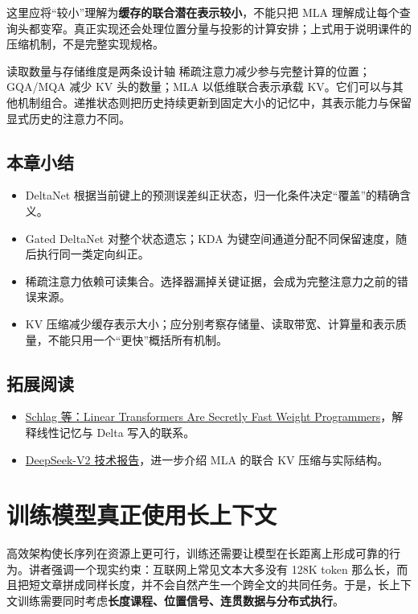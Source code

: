 \documentclass[11pt,a4paper]{article}
\begin{document}
这里应将“较小”理解为\textbf{缓存的联合潜在表示较小}，不能只把 MLA 理解成让每个查询头都变窄。真正实现还会处理位置分量与投影的计算安排；上式用于说明课件的压缩机制，不是完整实现规格。

\begin{importantbox}{读取数量与存储维度是两条设计轴}
稀疏注意力减少参与完整计算的位置；GQA/MQA 减少 KV 头的数量；MLA 以低维联合表示承载 KV。它们可以与其他机制组合。递推状态则把历史持续更新到固定大小的记忆中，其表示能力与保留显式历史的注意力不同。
\end{importantbox}

\subsection{本章小结}
\begin{itemize}
  \item DeltaNet 根据当前键上的预测误差纠正状态，归一化条件决定“覆盖”的精确含义。
  \item Gated DeltaNet 对整个状态遗忘；KDA 为键空间通道分配不同保留速度，随后执行同一类定向纠正。
  \item 稀疏注意力依赖可读集合。选择器漏掉关键证据，会成为完整注意力之前的错误来源。
  \item KV 压缩减少缓存表示大小；应分别考察存储量、读取带宽、计算量和表示质量，不能只用一个“更快”概括所有机制。
\end{itemize}

\subsection{拓展阅读}
\begin{itemize}
  \item \href{https://proceedings.mlr.press/v139/schlag21a.html}{Schlag 等：Linear Transformers Are Secretly Fast Weight Programmers}，解释线性记忆与 Delta 写入的联系。
  \item \href{https://arxiv.org/abs/2405.04434}{DeepSeek-V2 技术报告}，进一步介绍 MLA 的联合 KV 压缩与实际结构。
\end{itemize}

\clearpage
\section{训练模型真正使用长上下文}

高效架构使长序列在资源上更可行，训练还需要让模型在长距离上形成可靠的行为。讲者强调一个现实约束：互联网上常见文本大多没有 128K token 那么长，而且把短文章拼成同样长度，并不会自然产生一个跨全文的共同任务。于是，长上下文训练需要同时考虑\textbf{长度课程、位置信号、连贯数据与分布式执行}。
\end{document}
